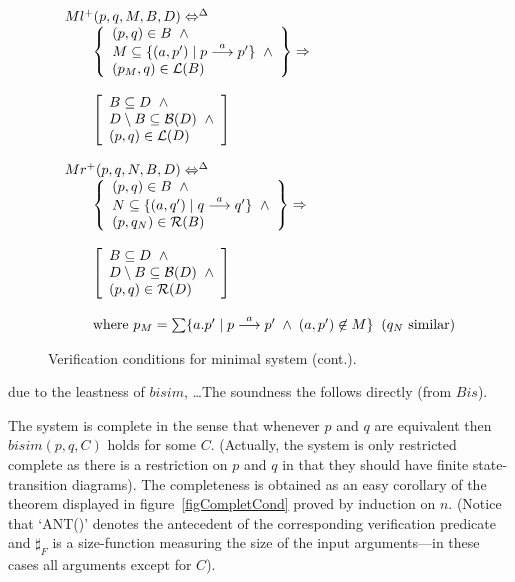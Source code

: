 \begin{figure}
\[
\begin{array}{lll}
\multicolumn{3}{l}{Ml^{+}(p,q,M,B,D) \Leftrightarrow^{\Delta}}\\
&&\left\{
\begin{array}{l}
(p,q)\in B\;\;\wedge\\
M\subseteq \{(a,p')\mid p\der{a}p'\}\;\;\wedge\\
(p_M,q)\in{\cal L}(B)
\end{array}
\right\}\Rightarrow\\
\\
&&\left[
\begin{array}{l}
B\subseteq D\;\;\wedge\\
D\setminus B\subseteq {\cal B}(D)\;\;\wedge\\
(p,q)\in{\cal L}(D)
\end{array}
\right]\\
\\

\multicolumn{3}{l}{Mr^{+}(p,q,N,B,D) \Leftrightarrow^{\Delta}}\\
&&\left\{
\begin{array}{l}
(p,q)\in B\;\;\wedge\\
N\subseteq \{(a,q')\mid q\der{a}q'\}\;\;\wedge\\
(p,q_N)\in{\cal R}(B)
\end{array}
\right\}\Rightarrow\\
\\
&&\left[
\begin{array}{l}
B\subseteq D\;\;\wedge\\
D\setminus B\subseteq {\cal B}(D)\;\;\wedge\\
(p,q)\in{\cal R}(D)
\end{array}
\right]\\
\\
&&\hbox{where } p_M=\sum \{a.p'\mid p\der{a}p'\;\wedge\; (a,p')\not\in M\}\;\; \hbox{($q_N$ similar)}\\



\end{array}
\]
\caption{Verification conditions for minimal system (cont.).\label{figVerCondB}}
\end{figure}
due to the leastness of $bisim$, \ldots The soundness the follows directly (from $Bis$).

The system is complete in the sense that whenever $p$ and $q$ are equivalent then $bisim(p,q,C)$ holds for some $C$. (Actually, the system is only restricted complete as there is a restriction on $p$ and $q$ in that they should have finite state-transition diagrams). The completeness is obtained as an easy corollary of the theorem displayed in figure~\ref{figCompletCond} proved by induction on $n$. (Notice that `ANT()' denotes the antecedent of the corresponding verification predicate and $\sharp_F$ is a size-function measuring the size of the input arguments---in these cases all arguments except for $C$).

